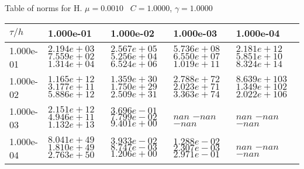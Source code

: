 \begin{center}
Table of norms for H. $\mu = 0.0010$ \, $C = 1.0000$, $\gamma = 1.0000$
  
\begin{tabular}{|p{1in}|p{1in}|p{1in}|p{1in}|p{1in}|} \hline
$\tau / h$ &1.000e-01 &1.000e-02 &1.000e-03 &1.000e-04 \\ \hline 
1.000e-01 & $2.194e+03$  $7.559e+02$  $1.314e+04$  & $2.567e+05$  $5.256e+04$  $6.524e+06$  & $5.736e+08$  $6.550e+07$  $1.019e+11$  & $2.181e+12$  $5.851e+10$  $8.324e+14$  \\ \hline 
1.000e-02 & $1.165e+12$  $3.177e+11$  $5.886e+12$  & $1.359e+30$  $1.750e+29$  $2.509e+31$  & $2.788e+72$  $2.023e+71$  $3.363e+74$  & $8.639e+103$  $1.349e+102$  $2.022e+106$  \\ \hline 
1.000e-03 & $2.151e+12$  $4.946e+11$  $1.132e+13$  & $3.696e-01$  $7.799e-02$  $9.401e+00$  & $nan$  $-nan$  $-nan$  & $nan$  $-nan$  $-nan$  \\ \hline 
1.000e-04 & $8.041e+49$  $1.810e+49$  $2.763e+50$  & $3.933e-02$  $8.747e-03$  $1.206e+00$  & $1.288e-02$  $2.307e-03$  $2.971e-01$  & $nan$  $-nan$  $-nan$  \\ \hline 

\end{tabular}\\[20pt]
\end{center}
